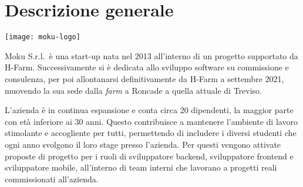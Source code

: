\section{Descrizione generale}

\begin{center}
	\texttt{[image: moku-logo]}
\end{center}

\noindent Moku S.r.l.\ è una start-up nata nel 2013 all'interno di un progetto supportato da H-Farm. Successivamente si è dedicata allo sviluppo software su commissione e consulenza, per poi allontanarsi definitivamente da H-Farm a settembre 2021, muovendo la sua sede dalla \emph{farm} a Roncade a quella attuale di Treviso.

L'azienda è in continua espansione e conta circa 20 dipendenti, la maggior parte con età inferiore ai 30 anni. Questo contribuisce a mantenere l'ambiente di lavoro stimolante e accogliente per tutti, permettendo di includere i diversi studenti che ogni anno svolgono il loro stage presso l'azienda. Per questi vengono attivate proposte di progetto per i ruoli di sviluppatore backend, sviluppatore frontend e sviluppatore mobile, all'interno di team interni che lavorano a progetti reali commissionati all'azienda.

